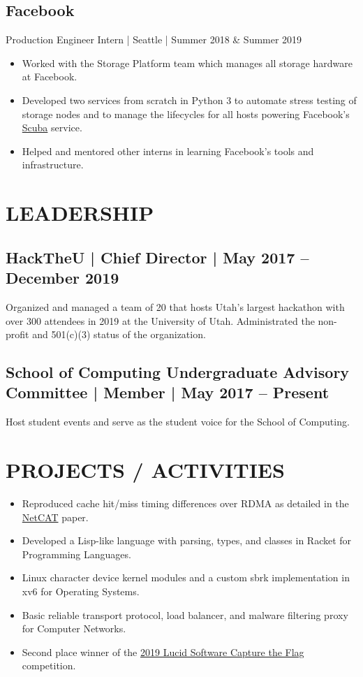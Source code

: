 \documentclass[10pt, letterpaper]{resume}
\begin{document}
\subsection{Facebook}
Production Engineer Intern | Seattle | Summer 2018 \& Summer 2019
\begin{itemize}
 \item Worked with the Storage Platform team which manages all storage hardware at Facebook.
 \item Developed two services from scratch in Python 3 to automate stress testing of storage nodes and to manage the lifecycles for all hosts powering Facebook's \href{https://research.fb.com/wp-content/uploads/2016/11/scuba-diving-into-data-at-facebook.pdf}{Scuba} service.
 \item Helped and mentored other interns in learning Facebook's tools and infrastructure.
\end{itemize}

\section{LEADERSHIP}
\subsection{HackTheU {\normalfont | Chief Director | May 2017 -- December 2019}}
Organized and managed a team of 20 that hosts Utah’s largest hackathon with over 300 attendees in 2019 at the University of Utah. Administrated the non-profit and 501(c)(3) status of the organization.

\subsection{School of Computing Undergraduate Advisory Committee {\normalfont |  Member | May 2017 -- Present}}
Host student events and serve as the student voice for the School of Computing.

\section{PROJECTS / ACTIVITIES}
\begin{itemize}
 \item Reproduced cache hit/miss timing differences over RDMA as detailed in the \href{https://download.vusec.net/papers/netcat_sp20.pdf}{NetCAT} paper.
 \item Developed a Lisp-like language with parsing, types, and classes in Racket for Programming Languages.
 \item Linux character device kernel modules and a custom sbrk implementation in xv6 for Operating Systems.
 \item Basic reliable transport protocol, load balancer, and malware filtering proxy for Computer Networks.

 \item Second place winner of the \href{https://github.com/lucidsoftware/ctf2019}{2019 Lucid Software Capture the Flag} competition.
\end{itemize}
\end{document}
